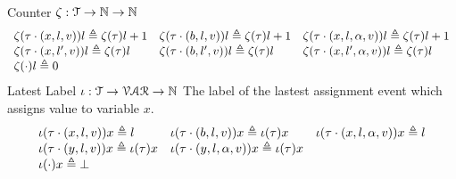 %
%
Counter $\mathtt{\zeta} : \mathcal{T} \to \mathbb{N} \to \mathbb{N}$ 
\[
\begin{array}{lll}
\mathtt{\zeta}(\mathtt{\tau} \cdot (x, l, v) ) l \triangleq \mathtt{\zeta}(\mathtt{\tau}) l + 1
&
\mathtt{\zeta}(\mathtt{\tau} \cdot (b, l, v)) l \triangleq \mathtt{\zeta}(\mathtt{\tau}) l + 1
&
\mathtt{\zeta}(\mathtt{\tau} \cdot (x, l, \alpha, v)) l \triangleq \mathtt{\zeta}(\mathtt{\tau}) l + 1
\\
\mathtt{\zeta}(\mathtt{\tau}  \cdot (x, l', v)) l \triangleq \mathtt{\zeta}(\mathtt{\tau} ) l
&
\mathtt{\zeta}(\mathtt{\tau} \cdot (b, l', v)) l \triangleq \mathtt{\zeta}(\mathtt{\tau} ) l
&
\mathtt{\zeta}(\mathtt{\tau} \cdot (x, l', \alpha, v)) l \triangleq \mathtt{\zeta}(\mathtt{\tau} ) l
\\
\mathtt{\zeta}(\cdot) l \triangleq 0
&&
\end{array}
\]
%
Latest Label $\iota : \mathcal{T} \to \mathcal{VAR} \to \mathbb{N}$ 
The label of the lastest assignment event which assigns value to variable $x$.
\[
  \begin{array}{lll}
\iota(\mathtt{\tau} \cdot (x, l, v) ) x \triangleq l
&
\iota(\mathtt{\tau} \cdot (b, l, v)) x \triangleq \iota(\mathtt{\tau}) x
&
\iota(\mathtt{\tau} \cdot (x, l, \alpha, v)) x \triangleq l
\\
\iota(\mathtt{\tau}  \cdot (y, l, v)) x \triangleq \iota(\mathtt{\tau} ) x
&
\iota(\mathtt{\tau} \cdot (y, l, \alpha, v)) x \triangleq \iota(\mathtt{\tau} ) x
\\
\iota(\cdot) x \triangleq \bot
&&
\end{array}
\]

